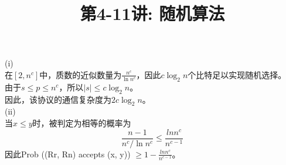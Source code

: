 \documentclass[a4paper, justified]{tufte-handout}
\title{第4-11讲: 随机算法}
\date{\zhtoday} %
\begin{document}
\maketitle
\noplagiarism %
\begin{abstract}
\end{abstract}
\beginrequired

\begin{problem}[JH 5.2.2.7]
\end{problem}

\begin{solution}
  (i)\\
  在$[2,n^c]$中，质数的近似数量为$\frac{n^c}{\ln n^c}$，因此$c\log_2{n}$个比特足以实现随机选择。\\
  由于$s\leq p\leq n^c$，所以$|s|\leq c\log_2{n}$。\\
  因此，该协议的通信复杂度为$2c\log_2{n}$。\\
  (ii)\\
  当$x\leq y$时，被判定为相等的概率为
  \[
    \frac{n-1}{n^c/\ln n^c}\leq  \frac{ln n^c}{n^{c-1}}
  \]
  因此Prob ((Rr, Rn) accepts (x, y)) $\geq 1 -\frac{ln n^c}{n^{c-1}} $。
\end{solution}

\begin{problem}[JH 5.2.2.8]
\end{problem}
\end{document}
